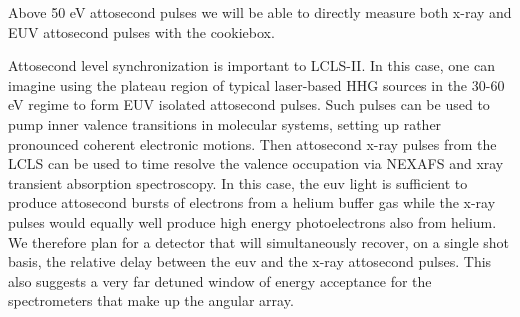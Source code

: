 Above 50 eV attosecond pulses we will be able to directly measure both x-ray and EUV attosecond pulses with the cookiebox.

Attosecond level synchronization is important to LCLS-II.
In this case, one can imagine using the plateau region of typical laser-based HHG sources in the 30-60 eV regime to form EUV isolated attosecond pulses.
Such pulses can be used to pump inner valence transitions in molecular systems, setting up rather pronounced coherent electronic motions.
Then attosecond x-ray pulses from the LCLS can be used to time resolve the valence occupation via NEXAFS and xray transient absorption spectroscopy.
In this case, the euv light is sufficient to produce attosecond bursts of electrons from a helium buffer gas while the x-ray pulses would equally well produce high energy photoelectrons also from helium.
We therefore plan for a detector that will simultaneously recover, on a single shot basis, the relative delay between the euv and the x-ray attosecond pulses.
This also suggests a very far detuned window of energy acceptance for the spectrometers that make up the angular array.


